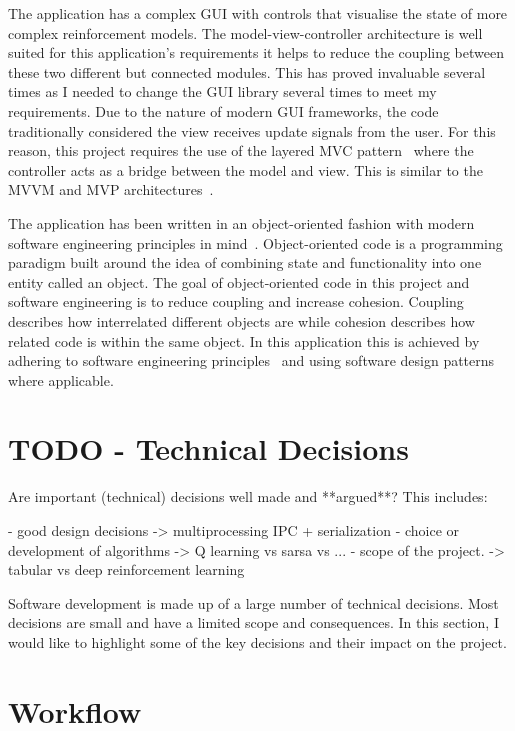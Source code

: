 \documentclass[]{final_report}
\begin{document}
The application has a complex GUI with controls that visualise the state of more complex reinforcement models. The model-view-controller architecture is well suited for this application's requirements it helps to reduce the coupling between these two different but connected modules. This has proved invaluable several times as I needed to change the GUI library several times to meet my requirements. Due to the nature of modern GUI frameworks, the code traditionally considered the view receives update signals from the user. For this reason, this project requires the use of the layered MVC pattern~\cite{webMVC}\cite{gamesMVC} where the controller acts as a bridge between the model and view. This is similar to the MVVM and MVP architectures~\cite{mvvm}.

The application has been written in an object-oriented fashion with modern software engineering principles in mind~\cite{van2008software}. Object-oriented code is a programming paradigm built around the idea of combining state and functionality into one entity called an object. The goal of object-oriented code in this project and software engineering is to reduce coupling and increase cohesion. Coupling describes how interrelated different objects are while cohesion describes how related code is within the same object. In this application this is achieved by adhering to software engineering principles~\cite{softwareEngineringPrinciples} and using software design patterns where applicable.

\section{TODO - Technical Decisions}


Are important (technical) decisions well made and **argued**? This includes:

 - good design decisions -> multiprocessing IPC + serialization
 - choice or development of algorithms -> Q learning vs sarsa vs ... 
 - scope of the project. -> tabular vs deep reinforcement learning


Software development is made up of a large number of technical decisions. Most decisions are small and have a limited scope and consequences. In this section, I would like to highlight some of the key decisions and their impact on the project. 


\pagebreak
\section{Workflow}
\end{document}
